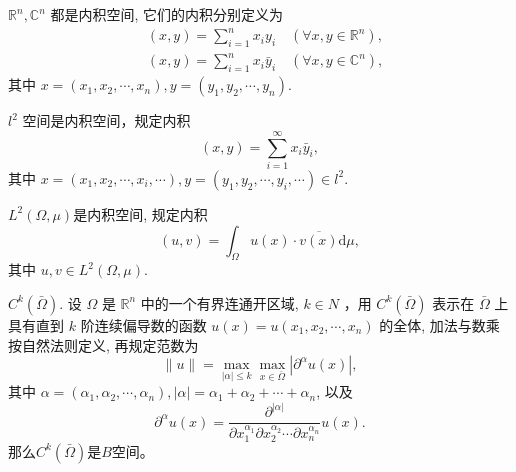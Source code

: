 \documentclass[lang=cn,newtx,10pt,scheme=chinese,thmcnt=chapter]{elegantbook}
\newcommand{\dif}{\mathrm{d}}
\begin{document}
\begin{example}
 $\mathbb{R} ^n, \mathbb{C} ^n$ 都是内积空间, 它们的内积分别定义为
\begin{equation*}
\begin{aligned}
& (x, y)=\sum_{i=1}^n x_i y_i \quad\left(\forall x, y \in \mathbb{R}^n\right), \\
& (x, y)=\sum_{i=1}^n x_i \bar{y}_i \quad\left(\forall x, y \in \mathbb{C} ^n\right),
\end{aligned}
\end{equation*}
其中 $x=\left(x_1, x_2, \cdots, x_n\right), y=\left(y_1, y_2, \cdots, y_n\right)$.
\end{example}
\begin{example}
 $l^2$ 空间是内积空间，规定内积
\begin{equation*}
(x, y)=\sum_{i=1}^{\infty} x_i \bar{y}_i,
\end{equation*}
其中 $x=\left(x_1, x_2, \cdots, x_i, \cdots\right), y=\left(y_1, y_2, \cdots, y_i, \cdots\right) \in l^2$.
\end{example}
\begin{example}
 $L^2(\Omega, \mu)$是内积空间, 规定内积
\begin{equation*}
(u, v)=\int_{\Omega} u(x) \cdot \overline{v(x)} \dif \mu,
\end{equation*}
其中 $u, v \in L^2(\Omega, \mu)$.
\end{example}
\begin{example} $C^k(\bar{\Omega})$. 设 $\Omega$ 是 $\mathbb{R} ^n$ 中的一个有界连通开区域, $k \in N$ ，用 $C^k(\bar{\Omega})$ 表示在 $\bar{\Omega}$ 上具有直到 $k$ 阶连续偏导数的函数 $u(x)=u\left(x_1, x_2, \cdots, x_n\right)$ 的全体, 加法与数乘按自然法则定义, 再规定范数为
\begin{equation*}
\|u\|=\max _{|\alpha| \leqslant k} \max _{x \in \bar{\Omega}}\left|\partial^\alpha u(x)\right|,
\end{equation*}
其中 $\alpha=\left(\alpha_1, \alpha_2, \cdots, \alpha_n\right),|\alpha|=\alpha_1+\alpha_2+\cdots+\alpha_n$, 以及
\begin{equation*}
\partial^\alpha u(x)=\frac{\partial^{|\alpha|}}{\partial x_1^{\alpha_1} \partial x_2^{\alpha_2} \cdots \partial x_n^{\alpha_n}} u(x) .
\end{equation*}
那么$C^k(\bar{\Omega})$是$B$空间。
\end{example}
\end{document}
